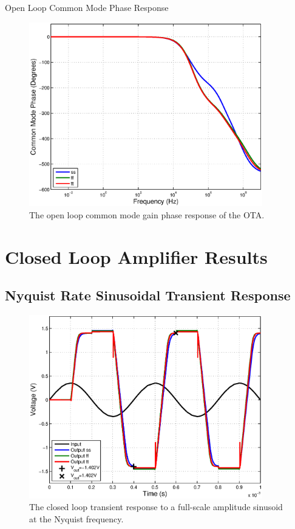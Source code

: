 \documentclass[journal]{IEEEtran}
\begin{document}
Open Loop Common Mode Phase Response
\begin{figure}
\centering
\includegraphics[width=4in]{Plots/open_cm_phase.eps}
\caption{The open loop common mode gain phase response of the OTA.}
\label{fig:open_cm_phase}
\end{figure}

\section{Closed Loop Amplifier Results}

\subsection{Nyquist Rate Sinusoidal Transient Response}

\begin{figure}
\centering
\includegraphics[width=4in]{Plots/closed_sine.eps}
\caption{The closed loop transient response to a full-scale amplitude sinusoid at the Nyquist frequency.}
\label{fig:closed_sine}
\end{figure}
\end{document}
